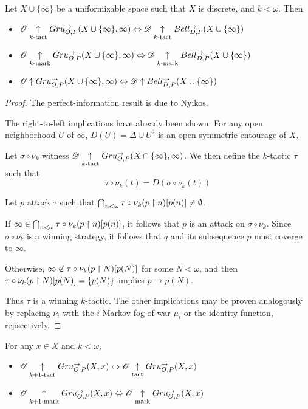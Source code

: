 \begin{thm}
  Let $X\cup\{\infty\}$ be a uniformizable space such that $X$ is discrete,
  and $k<\omega$. Then
  \begin{itemize}
    \item
      $
        \mathscr{O}\underset{k\text{-tact}}{\uparrow} Gru_{O,P}^{\to}(X\cup\{\infty\},\infty)
          \Leftrightarrow
        \mathscr{D} \underset{k\text{-tact}}{\uparrow} Bell_{D,P}^{\to}(X\cup\{\infty\})
      $
    \item
      $
        \mathscr{O}\underset{k\text{-mark}}{\uparrow} Gru_{O,P}^{\to}(X\cup\{\infty\},\infty)
          \Leftrightarrow
        \mathscr{D} \underset{k\text{-mark}}{\uparrow} Bell_{D,P}^{\to}(X\cup\{\infty\})
      $
    \item
      $
        \mathscr{O}\uparrow Gru_{O,P}^{\to}(X\cup\{\infty\},\infty)
          \Leftrightarrow
        \mathscr{D} \uparrow Bell_{D,P}^{\to}(X\cup\{\infty\})
      $
  \end{itemize}
\end{thm}

\begin{proof}
  The perfect-information result is due to Nyikos.

  The right-to-left implications have already been shown.
  For any open neighborhood $U$ of $\infty$,
  $D(U)=\Delta\cup U^2$ is an open symmetric entourage of $X$.

  Let $\sigma\circ\nu_k$ witness
  $\mathscr{D} \underset{k\text{-tact}}{\uparrow}Gru_{O,P}^{\to}(X\cap\{\infty\},\infty)$. We then define
  the $k$-tactic $\tau$ such that
    \[
      \tau\circ\nu_k(t) = D(\sigma\circ\nu_k(t))
    \]

  Let $p$ attack $\tau$ such that
  $\bigcap_{n<\omega}\tau\circ\nu_k(p\restriction n)[p(n)]\not=\emptyset$.

  If $\infty\in\bigcap_{n<\omega}\tau\circ\nu_k(p\restriction n)[p(n)]$, it follows
  that $p$
  is an attack on $\sigma\circ\nu_k$. Since $\sigma\circ\nu_k$ is a winning
  strategy, it follows
  that $q$ and its subsequence $p$ must coverge to $\infty$.

  Otherwise, $\infty\not\in\tau\circ\nu_k(p\restriction N)[p(N)]$ for some $N<\omega$,
  and then
  $\tau\circ\nu_k(p\restriction N)[p(N)]=\{p(N)\}$ implies $p\to p(N)$.

  Thus $\tau$ is a winning $k$-tactic. The other implications may
  be proven analogously by
  replacing $\nu_i$ with the $i$-Markov fog-of-war $\mu_i$ or the identity
  function, repsectively.
\end{proof}

\begin{prop} For any $x\in X$ and $k<\omega$,
  \begin{itemize}
    \item
      $
      \mathscr{O}\underset{k+1\text{-tact}}{\uparrow}Gru_{O,P}^{\to}(X,x)
        \Leftrightarrow
      \mathscr{O}\underset{\text{tact}}{\uparrow}Gru_{O,P}^{\to}(X,x)
      $
    \item
      $
      \mathscr{O}\underset{k+1\text{-mark}}{\uparrow}Gru_{O,P}^{\to}(X,x)
        \Leftrightarrow
      \mathscr{O}\underset{\text{mark}}{\uparrow}Gru_{O,P}^{\to}(X,x)
      $
  \end{itemize}
\end{prop}


